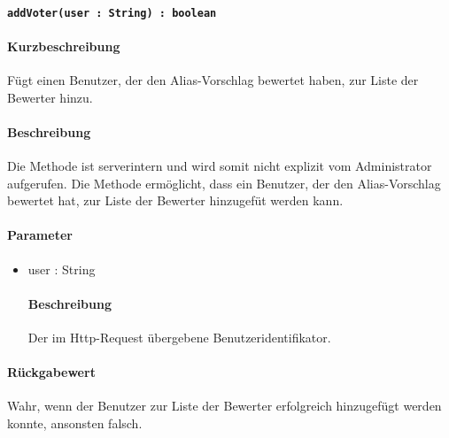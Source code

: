 \paragraph*{\texttt{addVoter(user : String) : boolean}}%
\paragraph*{Kurzbeschreibung}
Fügt einen Benutzer, der den Alias-Vorschlag bewertet haben, zur Liste der Bewerter hinzu.
\paragraph*{Beschreibung}
Die Methode ist serverintern und wird somit nicht explizit vom Administrator aufgerufen.
Die Methode ermöglicht, dass ein Benutzer, der den Alias-Vorschlag bewertet hat, zur Liste der Bewerter hinzugefüt werden kann.
\paragraph*{Parameter}
\begin{itemize}
    \item user : String
    		\paragraph*{Beschreibung}
    		Der im Http-Request übergebene Benutzeridentifikator.
\end{itemize}
\paragraph*{Rückgabewert}
Wahr, wenn der Benutzer zur Liste der Bewerter erfolgreich hinzugefügt werden konnte, ansonsten falsch.
